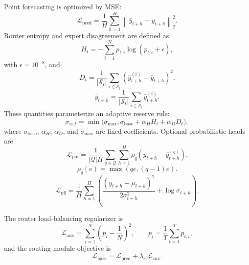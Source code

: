 \documentclass[review,1p,times]{elsarticle}
\begin{document}
Point forecasting is optimized by MSE:
\begin{equation}
\mathcal{L}_{\text{pred}} = \frac{1}{H}\sum_{h=1}^{H}\left\|\hat{y}_{t+h}-y_{t+h}\right\|_2^2.
\label{eq:loss_pred}
\end{equation}
Router entropy and expert disagreement are defined as
\begin{equation}
H_t = -\sum_{i=1}^{N} p_{t,i} \log(p_{t,i} + \epsilon),
\end{equation}
with $\epsilon=10^{-8}$, and
\begin{equation}
D_t = \frac{1}{|\mathcal{S}_t|} \sum_{i \in \mathcal{S}_t} \left(\hat{y}^{(i)}_{t+h} - \bar{y}_{t+h}\right)^2.
\end{equation}
\begin{equation}
\bar{y}_{t+h} = \frac{1}{|\mathcal{S}_t|} \sum_{i \in \mathcal{S}_t} \hat{y}^{(i)}_{t+h}.
\end{equation}
These quantities parameterize an adaptive reserve rule:
\begin{equation}
\sigma_{w,t} = \min\Big(\sigma_{\max}, \sigma_{\mathrm{base}} + \alpha_H H_t + \alpha_D D_t\Big),
\end{equation}
where $\sigma_{\mathrm{base}}$, $\alpha_H$, $\alpha_D$, and $\sigma_{\max}$ are fixed coefficients. Optional probabilistic heads are
\begin{equation}
\mathcal{L}_{\text{pin}}=\frac{1}{|\mathcal{Q}|H}\sum_{q\in\mathcal{Q}}\sum_{h=1}^{H}\rho_q\!\left(y_{t+h}-\hat{y}^{(q)}_{t+h}\right).
\end{equation}
\begin{equation}
\rho_q(e)=\max(qe,(q-1)e).
\end{equation}
\begin{equation}
\mathcal{L}_{\text{nll}}=\frac{1}{H}\sum_{h=1}^{H}\left(\frac{(y_{t+h}-\mu_{t+h})^2}{2\sigma_{t+h}^2}+\log\sigma_{t+h}\right).
\end{equation}

The router load-balancing regularizer is
\begin{equation}
\mathcal{L}_{\text{aux}} = \sum_{i=1}^{N}\left(\bar{p}_i - \frac{1}{N}\right)^2,\qquad
\bar{p}_i=\frac{1}{T}\sum_{t=1}^{T}p_{t,i},
\label{eq:loss_aux}
\end{equation}
\noindent and the routing-module objective is
\begin{equation}
\mathcal{L}_{\text{base}} = \mathcal{L}_{\text{pred}} + \lambda_r\,\mathcal{L}_{\text{aux}}.
\label{eq:loss_base}
\end{equation}
\end{document}
